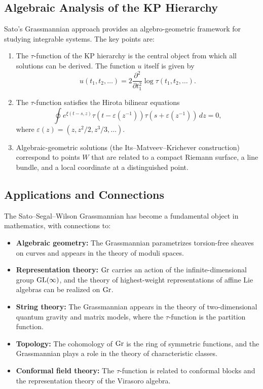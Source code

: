 \subsection{Algebraic Analysis of the KP Hierarchy}

Sato's Grassmannian approach provides an algebro-geometric framework for studying integrable systems. The key points are:

\begin{enumerate}
    \item The \(\tau\)-function of the KP hierarchy is the central object from which all solutions can be derived. The function \(u\) itself is given by
    \[
    u(t_1, t_2, \dots) = 2 \frac{\partial^2}{\partial t_1^2} \log \tau(t_1, t_2, \dots).
    \]
    
    \item The \(\tau\)-function satisfies the Hirota bilinear equations
    \[
    \oint e^{\xi(t-s, z)} \tau(t - \varepsilon(z^{-1})) \tau(s + \varepsilon(z^{-1})) \, dz = 0,
    \]
    where \(\varepsilon(z) = (z, z^2/2, z^3/3, \dots)\).
    
    \item Algebraic-geometric solutions (the Its--Matveev--Krichever construction) correspond to points \(W\) that are related to a compact Riemann surface, a line bundle, and a local coordinate at a distinguished point.
\end{enumerate}

\subsection{Applications and Connections}

The Sato--Segal--Wilson Grassmannian has become a fundamental object in mathematics, with connections to:

\begin{itemize}
    \item \textbf{Algebraic geometry:} The Grassmannian parametrizes torsion-free sheaves on curves and appears in the theory of moduli spaces.
    
    \item \textbf{Representation theory:} \(\operatorname{Gr}\) carries an action of the infinite-dimensional group \(\operatorname{GL}(\infty)\), and the theory of highest-weight representations of affine Lie algebras can be realized on \(\operatorname{Gr}\).
    
    \item \textbf{String theory:} The Grassmannian appears in the theory of two-dimensional quantum gravity and matrix models, where the \(\tau\)-function is the partition function.
    
    \item \textbf{Topology:} The cohomology of \(\operatorname{Gr}\) is the ring of symmetric functions, and the Grassmannian plays a role in the theory of characteristic classes.
    
    \item \textbf{Conformal field theory:} The \(\tau\)-function is related to conformal blocks and the representation theory of the Virasoro algebra.
\end{itemize}

